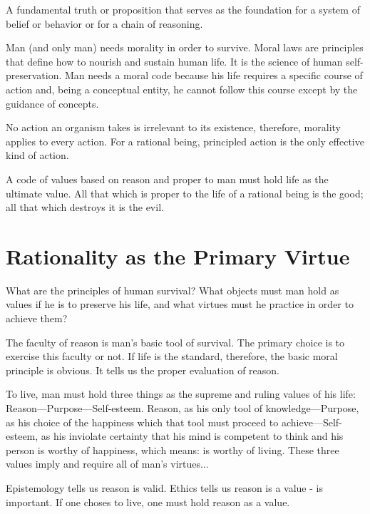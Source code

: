             \begin{definition}[Principle]
                \label{def:principle}
                    A fundamental truth or proposition that serves as the foundation for a system of belief or behavior or for a chain of reasoning.
            \end{definition}

        Man (and only man) needs morality in order to survive. Moral laws are principles that define how to nourish and sustain human life. It is the science of human self-preservation. Man needs a moral code because his life requires a specific course of action and, being a conceptual entity, he cannot follow this course except by the guidance of concepts.
        
        No action an organism takes is irrelevant to its existence, therefore, morality applies to every action. For a rational being, principled action is the only effective kind of action.

        A code of values based on reason and proper to man must hold life as the ultimate value. All that which is proper to the life of a rational being is the good; all that which destroys it is the evil.

    \section{Rationality as the Primary Virtue}

        What are the principles of human survival? What objects must man hold as values if he is to preserve his life, and what virtues must he practice in order to achieve them?

        The faculty of reason is man's basic tool of survival. The primary choice is to exercise this faculty or not. If life is the standard, therefore, the basic moral principle is obvious. It tells us the proper evaluation of reason.

        To live, man must hold three things as the supreme and ruling values of his life: Reason—Purpose—Self-esteem. Reason, as his only tool of knowledge—Purpose, as his choice of the happiness which that tool must proceed to achieve—Self-esteem, as his inviolate certainty that his mind is competent to think and his person is worthy of happiness, which means: is worthy of living. These three values imply and require all of man's virtues...

        Epistemology tells us reason is valid. Ethics tells us reason is a value - is important. If one choses to live, one must hold reason as a value.

